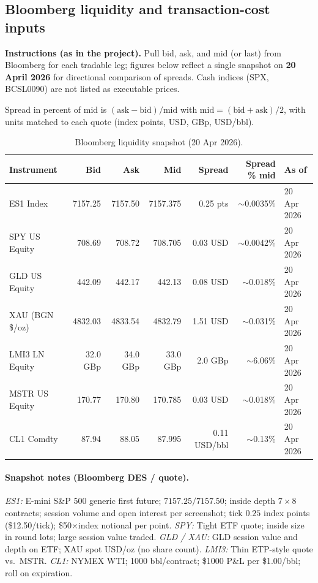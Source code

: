 \documentclass[11pt]{article}
\begin{document}
\subsection{Bloomberg liquidity and transaction-cost inputs}
\label{subsec:bloomberg-liquidity}

\textbf{Instructions (as in the project).} Pull bid, ask, and mid (or last) from Bloomberg for each tradable leg; figures below reflect a single snapshot on \textbf{20 April 2026} for directional comparison of spreads. Cash indices (SPX, BCSL0090) are not listed as executable prices.

Spread in percent of mid is $(\mathrm{ask}-\mathrm{bid})/\mathrm{mid}$ with $\mathrm{mid}=(\mathrm{bid}+\mathrm{ask})/2$, with units matched to each quote (index points, USD, GBp, USD/bbl).

\begin{table}[htbp]
  \centering
  \caption{Bloomberg liquidity snapshot (20 Apr 2026).}
  \label{tab:liquidity}
  \footnotesize
  \begin{tabular}{@{}l r r r r r l@{}}
    \toprule
    \textbf{Instrument} & \textbf{Bid} & \textbf{Ask} & \textbf{Mid} & \textbf{Spread} & \textbf{Spread \% mid} & \textbf{As of} \\
    \midrule
    ES1 Index      & 7157.25 & 7157.50 & 7157.375 & 0.25 pts   & $\sim$0.0035\% & 20 Apr 2026 \\
    SPY US Equity  & 708.69  & 708.72  & 708.705  & 0.03 USD   & $\sim$0.0042\% & 20 Apr 2026 \\
    GLD US Equity  & 442.09  & 442.17  & 442.13   & 0.08 USD   & $\sim$0.018\%  & 20 Apr 2026 \\
    XAU (BGN \$/oz) & 4832.03 & 4833.54 & 4832.79  & 1.51 USD   & $\sim$0.031\%  & 20 Apr 2026 \\
    LMI3 LN Equity & 32.0 GBp & 34.0 GBp & 33.0 GBp & 2.0 GBp & $\sim$6.06\%   & 20 Apr 2026 \\
    MSTR US Equity & 170.77  & 170.80  & 170.785  & 0.03 USD   & $\sim$0.018\%  & 20 Apr 2026 \\
    CL1 Comdty     & 87.94   & 88.05   & 87.995   & 0.11 USD/bbl & $\sim$0.13\% & 20 Apr 2026 \\
    \bottomrule
  \end{tabular}
\end{table}

\paragraph{Snapshot notes (Bloomberg DES / quote).}
\textit{ES1:} E-mini S\&P 500 generic first future; $7157.25/7157.50$; inside depth $7\times8$ contracts; session volume and open interest per screenshot; tick $0.25$ index points (\$12.50/tick); \$50$\times$index notional per point.
\textit{SPY:} Tight ETF quote; inside size in round lots; large session value traded.
\textit{GLD / XAU:} GLD session value and depth on ETF; XAU spot USD/oz (no share count).
\textit{LMI3:} Thin ETP-style quote vs.\ MSTR.
\textit{CL1:} NYMEX WTI; 1000 bbl/contract; \$1000 P\&L per \$1.00/bbl; roll on expiration.
\end{document}
